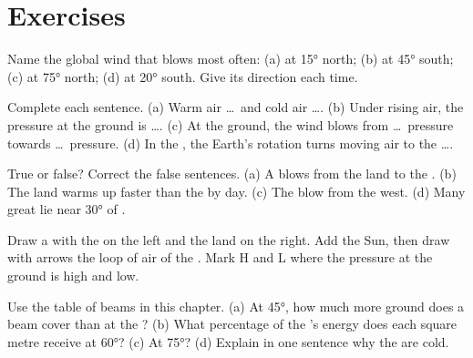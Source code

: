 \section{Exercises}

\begin{exercise}[$\star$]\label{exo:g8:winds-global-circulation:1}
Name the global wind that blows most often: (a) at \ang{15} north;
(b) at \ang{45} south; (c) at \ang{75} north; (d) at \ang{20} south.
Give its direction each time.
\end{exercise}

\begin{exercise}[$\star$]\label{exo:g8:winds-global-circulation:2}
Complete each sentence. (a) Warm air \dots\ and cold air \dots. (b) Under
rising air, the pressure at the ground is \dots. (c) At the ground, the
wind blows from \dots\ pressure towards \dots\ pressure. (d) In the
, the Earth's rotation turns moving air to the \dots.
\end{exercise}

\begin{exercise}[$\star$]\label{exo:g8:winds-global-circulation:3}
True or false? Correct the false sentences. (a) A  blows from
the land to the . (b) The land warms up faster than the  by day.
(c) The  blow from the west. (d) Many great  lie near
\ang{30} of .
\end{exercise}

\begin{exercise}[$\star$]\label{exo:g8:winds-global-circulation:4}
Draw a  with the  on the left and the land on the right. Add
the Sun, then draw with arrows the loop of air of the . Mark
H and L where the pressure at the ground is high and low.
\end{exercise}

\begin{exercise}[$\star\star$]\label{exo:g8:winds-global-circulation:5}
Use the table of beams in this chapter. (a) At \ang{45}, how much more
ground does a beam cover than at the ? (b) What percentage of the
's energy does each square metre receive at \ang{60}? (c) At
\ang{75}? (d) Explain in one sentence why the  are cold.
\end{exercise}

